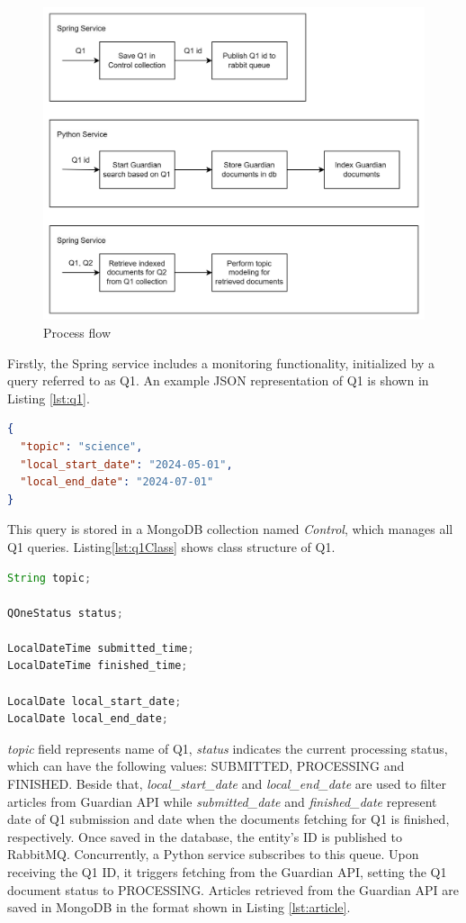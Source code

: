 \begin{figure}
    \centering
    \includegraphics[width=0.7\linewidth] {././figures/diagram}
    \caption{Process flow}
\end{figure}

Firstly, the Spring service includes a monitoring functionality, initialized by a query referred to as Q1. An
example JSON representation of Q1 is shown in Listing \ref{lst:q1}.

\begin{lstlisting}[language=json, caption={JSON representation of Q1}, label={lst:q1}]
{
  "topic": "science",
  "local_start_date": "2024-05-01",
  "local_end_date": "2024-07-01"
}
\end{lstlisting}

This query is stored in a MongoDB collection named \textit{Control}, which manages all Q1 queries.
Listing\ref{lst:q1Class} shows class structure of Q1.

\begin{lstlisting}[language=Java, caption={Class definition of QOne}, label={lst:q1Class}]
String topic;

QOneStatus status;

LocalDateTime submitted_time;
LocalDateTime finished_time;

LocalDate local_start_date;
LocalDate local_end_date;
\end{lstlisting}

\textit{topic} field represents name of Q1, \textit{status} indicates the current processing status, which can
have the following values: SUBMITTED, PROCESSING and FINISHED. Beside that, \textit{local\_start\_date} and
\textit{local\_end\_date} are used to filter articles from Guardian API while \textit{submitted\_date} and
\textit{finished\_date} represent date of Q1 submission and date when the documents fetching for Q1 is finished,
respectively. Once saved in the database, the entity's ID is published to RabbitMQ.
\newline
Concurrently, a Python service subscribes to this queue. Upon receiving the Q1 ID, it triggers fetching from
the Guardian API, setting the Q1 document status to PROCESSING. Articles retrieved from the Guardian API are saved
in MongoDB in the format shown in Listing \ref{lst:article}.

